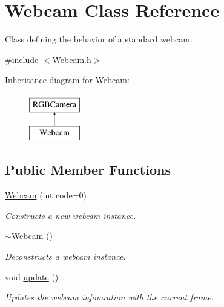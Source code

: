\hypertarget{class_webcam}{}\section{Webcam Class Reference}
\label{class_webcam}


Class defining the behavior of a standard webcam.  




{\ttfamily \#include $<$Webcam.\+h$>$}

Inheritance diagram for Webcam\+:\begin{figure}[H]
\begin{center}
\leavevmode
\includegraphics[height=2.000000cm]{class_webcam}
\end{center}
\end{figure}
\subsection*{Public Member Functions}
\begin{DoxyCompactItemize}
\item 
\hyperlink{class_webcam_ae3694760a88e8975940045ec8d4c27ed}{Webcam} (int code=0)
\begin{DoxyCompactList}\small\item\em Constructs a new webcam instance. \end{DoxyCompactList}\item 
\hypertarget{class_webcam_a573d188c6505287dadb895b1ee7526b9}{}\label{class_webcam_a573d188c6505287dadb895b1ee7526b9} 
\hyperlink{class_webcam_a573d188c6505287dadb895b1ee7526b9}{$\sim$\+Webcam} ()
\begin{DoxyCompactList}\small\item\em Deconstructs a webcam instance. \end{DoxyCompactList}\item 
\hypertarget{class_webcam_a3d5cab0a2b87b90b85793bc05414e503}{}\label{class_webcam_a3d5cab0a2b87b90b85793bc05414e503} 
void \hyperlink{class_webcam_a3d5cab0a2b87b90b85793bc05414e503}{update} ()
\begin{DoxyCompactList}\small\item\em Updates the webcam infomration with the current frame. \end{DoxyCompactList}\end{DoxyCompactItemize}
